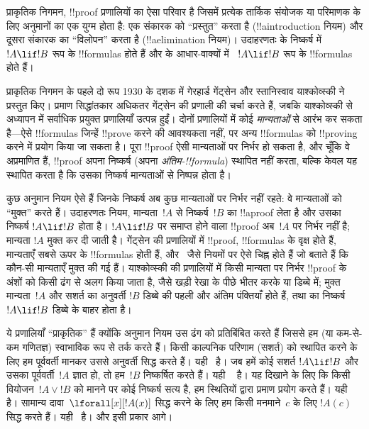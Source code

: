 \documentclass[../../../include/open-logic-section]{subfiles}
\begin{document}


प्राकृतिक निगमन, !!{proof} प्रणालियों का ऐसा परिवार है जिसमें प्रत्येक
तार्किक संयोजक या परिमाणक के लिए अनुमानों का एक युग्म होता है: एक संकारक को
``प्रस्तुत'' करता है (!!a{introduction} नियम) और दूसरा संकारक का ``विलोपन''
करता है (!!a{elimination} नियम)। उदाहरणतः \Intro{\lif} के निष्कर्ष में~$!A
\lif !B$ रूप के !!{formula}s होते हैं और \Elim{\lif} के आधार-वाक्यों में
~$!A \lif !B$ रूप के !!{formula}s होते हैं।

प्राकृतिक निगमन के पहले दो रूप 1930 के दशक में गेरहार्ड गेंट्सेन और स्तानिस्वाव
याश्कोव्स्की ने प्रस्तुत किए। प्रमाण सिद्धांतकार अधिकतर गेंट्सेन की प्रणाली
की चर्चा करते हैं, जबकि याश्कोव्स्की से अध्यापन में सर्वाधिक प्रयुक्त
प्रणालियाँ उत्पन्न हुईं। दोनों प्रणालियों में कोई \emph{मान्यताओं} से आरंभ
कर सकता है---ऐसे !!{formula}s जिन्हें !!{prove} करने की आवश्यकता नहीं, पर
अन्य !!{formula}s को !!{proving} करने में प्रयोग किया जा सकता है। पूरा
!!{proof} ऐसी मान्यताओं पर निर्भर हो सकता है, और चूँकि वे अप्रमाणित हैं,
!!{proof} अपना निष्कर्ष (अपना \emph{अंतिम-!!{formula}}) स्थापित नहीं करता,
बल्कि केवल यह स्थापित करता है कि उसका निष्कर्ष मान्यताओं से निष्पन्न होता है।

कुछ अनुमान नियम ऐसे हैं जिनके निष्कर्ष अब कुछ मान्यताओं पर निर्भर नहीं रहते:
वे मान्यताओं को ``मुक्त'' करते हैं। उदाहरणतः \Intro{\lif} नियम, मान्यता~$!A$
से निष्कर्ष~$!B$ का !!a{proof} लेता है और उसका निष्कर्ष $!A \lif !B$ होता
है। $!A \lif !B$ पर समाप्त होने वाला !!{proof} अब~$!A$ पर निर्भर नहीं है;
मान्यता $!A$ मुक्त कर दी जाती है। गेंट्सेन की प्रणालियों में !!{proof},
!!{formula}s के वृक्ष होते हैं, मान्यताएँ सबसे ऊपर के !!{formula}s होती हैं,
और~\Intro{\lif} जैसे नियमों पर ऐसे चिह्न होते हैं जो बताते हैं कि कौन-सी
मान्यताएँ मुक्त की गई हैं। याश्कोव्स्की की प्रणालियों में किसी मान्यता पर
निर्भर !!{proof} के अंशों को किसी ढंग से अलग किया जाता है, जैसे खड़ी रेखा के
पीछे भीतर करके या डिब्बे में; मुक्त मान्यता~$!A$ और सशर्त का अनुवर्ती $!B$
डिब्बे की पहली और अंतिम पंक्तियाँ होते हैं, तथा \Intro{\lif} का निष्कर्ष~$!A
\lif !B$ डिब्बे के बाहर होता है।

ये प्रणालियाँ ``प्राकृतिक'' हैं क्योंकि अनुमान नियम उस ढंग को प्रतिबिंबित
करते हैं जिससे हम (या कम-से-कम गणितज्ञ) स्वाभाविक रूप से तर्क करते हैं। किसी
काल्पनिक परिणाम (सशर्त) को स्थापित करने के लिए हम पूर्ववर्ती मानकर उससे
अनुवर्ती सिद्ध करते हैं। यही~\Intro{\lif} है। जब हमें कोई सशर्त $!A \lif !B$
और उसका पूर्ववर्ती~$!A$ ज्ञात हो, तो हम~$!B$ निष्कर्षित करते हैं। यही
~\Elim{\lif} है। यह दिखाने के लिए कि किसी वियोजन~$!A \lor !B$ को मानने पर
कोई निष्कर्ष सत्य है, हम स्थितियों द्वारा प्रमाण प्रयोग करते हैं। यही
~\Elim{\lor} है। सामान्य दावा~$\lforall[x][!A(x)]$ सिद्ध करने के लिए हम किसी
मनमाने~$c$ के लिए $!A(c)$ सिद्ध करते हैं। यही~\Intro{\lforall} है। और इसी
प्रकार आगे।
\end{document}
